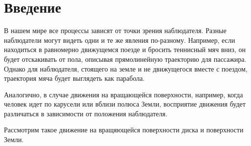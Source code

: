 \section{Введение}
В нашем мире все процессы зависят от точки зрения наблюдателя. Разные наблюдатели могут видеть одни и те же явления по-разному. Например, если находиться в равномерно движущемся поезде и бросить теннисный мяч вниз, он будет отскакивать от пола, описывая прямолинейную траекторию для пассажира. Однако для наблюдателя, стоящего на земле и не движущегося вместе с поездом, траектория мяча будет выглядеть как парабола.

Аналогично, в случае движения на вращающейся поверхности, например, когда человек идет по карусели или вблизи полюса Земли, восприятие движения будет различаться в зависимости от положения наблюдателя.

Рассмотрим такое движение на вращяющейся поверхности диска и поверхности  Земли.